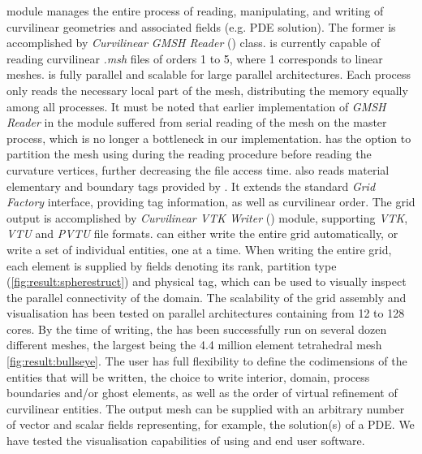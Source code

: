 \noindent
\curvgrid{} module manages the entire process of reading, manipulating, and writing of curvilinear geometries and associated fields (e.g. PDE solution). The former is accomplished by \textit{Curvilinear GMSH Reader} (\curvreader{}) class. \curvreader{} is currently capable of reading curvilinear \textit{.msh} files of orders 1 to 5, where 1 corresponds to linear meshes. \curvreader{} is fully parallel and scalable for large parallel architectures. Each process only reads the necessary local part of the mesh, distributing the memory equally among all processes. It must be noted that earlier implementation of \textit{GMSH Reader} in the \dunegrid{} module suffered from serial reading of the mesh on the master process, which is no longer a bottleneck in our implementation. \curvreader{} has the option to partition the mesh using \ParMETIS{} during the reading procedure before reading the curvature vertices, further decreasing the file access time. \curvreader{} also reads material elementary and boundary tags provided by \gmsh{}. It extends the standard \textit{Grid Factory} interface, providing tag information, as well as curvilinear order. The grid output is accomplished by \textit{Curvilinear VTK Writer} (\curvwriter{}) module, supporting \textit{VTK}, \textit{VTU} and \textit{PVTU} file formats. \curvwriter{} can either write the entire grid automatically, or write a set of individual entities, one at a time. When writing the entire grid, each element is supplied by fields denoting its rank, partition type (\cref{fig:result:spherestruct}) and physical tag, which can be used to visually inspect the parallel connectivity of the domain. The scalability of the grid assembly and visualisation has been tested on parallel architectures containing from 12 to 128 cores. By the time of writing, the \curvgrid has been successfully run on several dozen different meshes, the largest being the 4.4 million element tetrahedral mesh \cref{fig:result:bullseye}. The user has full flexibility to define the codimensions of the entities that will be written, the choice to write interior, domain, process boundaries and/or ghost elements, as well as the order of virtual refinement of curvilinear entities. The output mesh can be supplied with an arbitrary number of vector and scalar fields representing, for example, the solution(s) of a PDE. We have tested the visualisation capabilities of \curvgrid{} using \ParaView{} \cite{johnson+2005} and \visit{} \cite{childs+2012} end user software. \\

